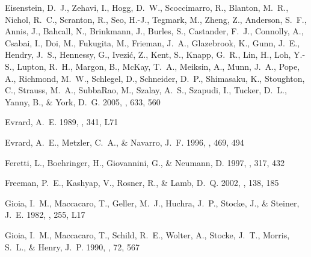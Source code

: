 \documentclass[12pt,preprint]{aastex}
\begin{document}
\begin{thebibliography}{}
{Eisenstein}, D.~J., {Zehavi}, I., {Hogg}, D.~W., {Scoccimarro}, R., {Blanton},
  M.~R., {Nichol}, R.~C., {Scranton}, R., {Seo}, H.-J., {Tegmark}, M., {Zheng},
  Z., {Anderson}, S.~F., {Annis}, J., {Bahcall}, N., {Brinkmann}, J., {Burles},
  S., {Castander}, F.~J., {Connolly}, A., {Csabai}, I., {Doi}, M., {Fukugita},
  M., {Frieman}, J.~A., {Glazebrook}, K., {Gunn}, J.~E., {Hendry}, J.~S.,
  {Hennessy}, G., {Ivezi{\'c}}, Z., {Kent}, S., {Knapp}, G.~R., {Lin}, H.,
  {Loh}, Y.-S., {Lupton}, R.~H., {Margon}, B., {McKay}, T.~A., {Meiksin}, A.,
  {Munn}, J.~A., {Pope}, A., {Richmond}, M.~W., {Schlegel}, D., {Schneider},
  D.~P., {Shimasaku}, K., {Stoughton}, C., {Strauss}, M.~A., {SubbaRao}, M.,
  {Szalay}, A.~S., {Szapudi}, I., {Tucker}, D.~L., {Yanny}, B., \& {York},
  D.~G. 2005, \apj, 633, 560

{Evrard}, A.~E. 1989, \apjl, 341, L71

{Evrard}, A.~E., {Metzler}, C.~A., \& {Navarro}, J.~F. 1996, \apj, 469, 494

{Feretti}, L., {Boehringer}, H., {Giovannini}, G., \& {Neumann}, D. 1997, \aap,
  317, 432

{Freeman}, P.~E., {Kashyap}, V., {Rosner}, R., \& {Lamb}, D.~Q. 2002, \apjs,
  138, 185

{Gioia}, I.~M., {Maccacaro}, T., {Geller}, M.~J., {Huchra}, J.~P., {Stocke},
  J., \& {Steiner}, J.~E. 1982, \apjl, 255, L17

{Gioia}, I.~M., {Maccacaro}, T., {Schild}, R.~E., {Wolter}, A., {Stocke},
  J.~T., {Morris}, S.~L., \& {Henry}, J.~P. 1990, \apjs, 72, 567


\end{thebibliography}
\end{document}
